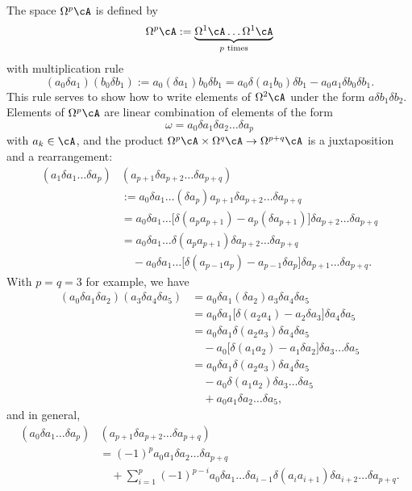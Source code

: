 The space $\Omega^p\cA$ is defined by
\[ 
  \Omega^p\cA:=\underbrace{\Omega^1\cA\ldots\Omega^1\cA}_{\text{$p$ times}}
\]
with multiplication rule
\begin{equation}
  (a_0\delta a_1)(b_0\delta b_1):=a_0(\delta a_1)b_0\delta b_1
		=a_0\delta(a_1b_0)\delta b_1-a_0a_1\delta b_0\delta b_1.
\end{equation}
This rule serves to show how to write elements of $\Omega^2\cA$ under the form $a\delta b_1\delta b_2$. Elements of $\Omega^p\cA$ are linear combination of elements of the form
\[ 
  \omega=a_0\delta a_1\delta a_2\ldots \delta a_p
\]
with $a_k\in\cA$, and the product $\Omega^p\cA\times\Omega^q\cA\to\Omega^{p+q}\cA$ is a juxtaposition and a rearrangement:
\[ 
\begin{split}
  (a_1\delta a_1\ldots\delta a_p)&(a_{p+1}\delta a_{p+2}\ldots\delta a_{p+q})\\
		&:=a_0\delta a_1\ldots (\delta a_p)a_{p+1}\delta a_{p+2}\ldots\delta a_{p+q}\\
	&=a_0\delta a_1\ldots \big[ \delta(a_pa_{p+1})-a_p(\delta a_{p+1}) \big]\delta a_{p+2}\ldots\delta a_{p+q}\\
	&=a_0\delta a_1\ldots\delta(a_pa_{p+1})\delta a_{p+2}\ldots\delta a_{p+q}\\
	&\quad -a_0\delta a_1\ldots\big[ \delta(a_{p-1}a_p)-a_{p-1}\delta a_p \big]\delta a_{p+1}\ldots\delta a_{p+q}.
\end{split}  
\]
With $p=q=3$ for example, we have
\[ 
\begin{split}
  (a_0\delta a_1\delta a_2)(a_3\delta a_4\delta a_5)&=a_0\delta a_1(\delta a_2)a_3\delta a_4\delta a_5\\
		&=a_0\delta a_1\big[ \delta(a_2 a_4)-a_2\delta a_3 \big]\delta a_4\delta a_5\\
		&=a_0\delta a_1\delta(a_2 a_3)\delta a_4\delta a_5\\
		&\quad -a_0\big[ \delta(a_1 a_2)-a_1\delta a_2 \big]\delta a_3\ldots\delta a_5\\
		&=a_0\delta a_1\delta(a_2a_3)\delta a_4\delta a_5\\
		&\quad-a_0\delta(a_1a_2)\delta a_3\ldots\delta a_5\\
		&\quad+a_0a_1\delta a_2\ldots\delta a_5,
\end{split}  
\]
and in general,
\begin{equation}    \label{Eq_decmProdConnForDelta}
\begin{split}
(a_0\delta a_1\ldots \delta a_p)&(a_{p+1}\delta a_{p+2}\ldots\delta a_{p+q})\\&=(-1)^pa_0a_1\delta a_2\ldots\delta a_{p+q}\\
	&\quad+\sum_{i=1}^p(-1)^{p-i}a_0\delta a_1\ldots\delta a_{i-1}\delta(a_ia_{i+1})\delta a_{i+2}\ldots\delta a_{p+q}.
\end{split}
\end{equation}
